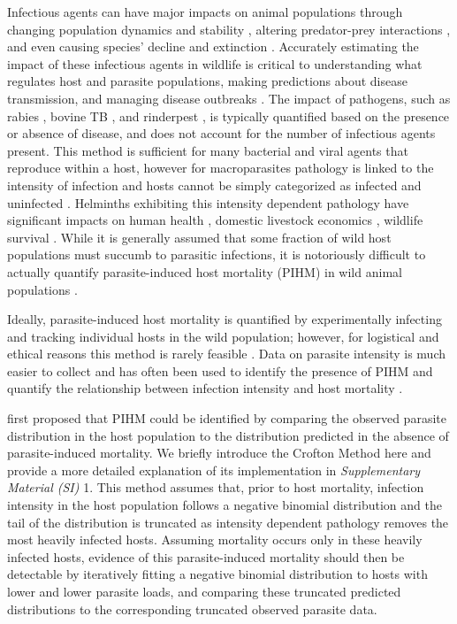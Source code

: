 \documentclass[12pt, a4paper]{article}
\begin{document}
Infectious agents can have major impacts on animal populations through changing
population dynamics and stability \citep{Dobson1992}, altering predator-prey interactions \citep{Joly2004}, and
even causing species' decline and extinction \citep{DeCastro2005a,McCallum2012b}. Accurately estimating the impact
of these infectious agents in wildlife is critical to understanding what
regulates host and parasite populations, making predictions about disease
transmission, and managing disease outbreaks \citep{Langwig2015}. The impact of pathogens, such as rabies \citep{Coyne1989}, bovine TB \citep{Cox2005}, and
rinderpest \citep{Tille1991}, is typically quantified based on the presence or absence of
disease, and does not account for the number of infectious agents present.
This method is sufficient for many bacterial and viral agents that reproduce within a
host, however for macroparasites pathology is linked to the intensity of infection and hosts cannot be simply categorized as infected and
uninfected \citep{AndersonandMay1979,Lafferty2002}.  Helminths exhibiting this intensity dependent pathology have
significant impacts on human health \citep{Brooker2004}, domestic livestock economics \citep{Roeber2013},
wildlife survival \citep{Kirk2003, Logiudice2003}.  While it is generally assumed that some fraction of
wild host populations must succumb to parasitic infections, it is notoriously
difficult to actually quantify parasite-induced host mortality (PIHM) in wild
animal populations \citep{McCallum2000a}.

Ideally, parasite-induced host mortality is
quantified by experimentally infecting and tracking individual hosts in the
wild population; however, for logistical and ethical reasons this method is
rarely feasible \citep{McCallum2000a}. Data on parasite intensity is much easier to collect and has
often been used to identify the presence of PIHM \citep{Crofton1971a,Lester1977,Lester1984,Lanciani1989,Royce1990,Ferguson2011} and quantify the
relationship between infection intensity and host mortality \citep{Adjei1986}.

\cite{Crofton1971a} first proposed that PIHM could be identified by comparing the
observed parasite distribution in the host population to the distribution
predicted in the absence of parasite-induced mortality. We briefly introduce the Crofton Method here and provide a more detailed explanation of its implementation in \emph{Supplementary Material (SI)} 1. This method
assumes that, prior to host mortality, infection intensity in the host population follows a negative binomial distribution and the tail of the distribution is truncated as intensity dependent pathology removes the most heavily infected hosts. Assuming mortality occurs only in these heavily infected hosts, evidence of this parasite-induced mortality should then be detectable by iteratively
fitting a negative binomial distribution to hosts with lower and lower parasite
loads, and comparing these truncated predicted distributions to the corresponding truncated observed parasite data.
\end{document}

